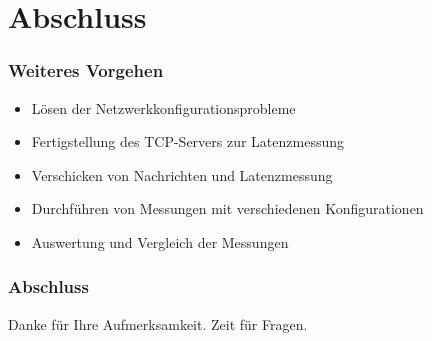 \documentclass{beamer}
\begin{document}
\section{Abschluss}

    \begin{frame}
        \frametitle{Weiteres Vorgehen}

        \begin{itemize}
            \item Lösen der Netzwerkkonfigurationsprobleme
            \item Fertigstellung des TCP-Servers zur Latenzmessung
            \item Verschicken von Nachrichten und Latenzmessung
            \item Durchführen von Messungen mit verschiedenen Konfigurationen
            \item Auswertung und Vergleich der Messungen
        \end{itemize}
    \end{frame}

    \begin{frame}
        \frametitle{Abschluss}

        Danke für Ihre Aufmerksamkeit.
        \vfill
        Zeit für Fragen.
    \end{frame}


    \bgroup
    \begin{frame}[plain]{}
    \end{frame}
    \egroup
\end{document}
